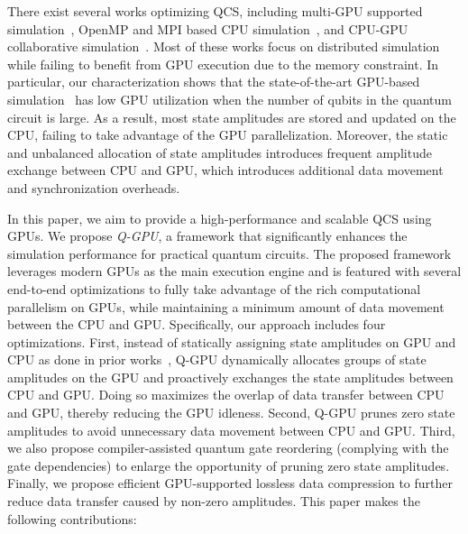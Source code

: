 There exist several works optimizing QCS, including multi-GPU supported simulation~\cite{10.1109/SC41405.2020.00017,10.1007/978-3-319-68505-2_8}, OpenMP and MPI based CPU simulation~\cite{10.1145/3126908.3126947,10.1145/3295500.3356155,10.48550/arXiv.1710.05867}, and CPU-GPU collaborative simulation~\cite{10.1145/3310273.3323053}. Most of these works focus on distributed simulation while failing to benefit from GPU execution due to the memory constraint. 
In particular, our characterization shows that the state-of-the-art GPU-based simulation~\cite{10.1145/3310273.3323053} has low GPU utilization when the number of qubits in the quantum circuit is large. As a result, most state amplitudes are stored and updated on the CPU, failing to take advantage of the GPU parallelization. Moreover, the static and unbalanced allocation of state amplitudes introduces frequent amplitude exchange between CPU and GPU, which introduces additional data movement and synchronization overheads. 


\par In this paper, we aim to provide a high-performance and scalable QCS using GPUs.
We propose \emph{Q-GPU}, a framework that significantly enhances the simulation performance for practical quantum circuits. The proposed framework leverages modern GPUs as the main execution engine and is featured with several end-to-end optimizations to fully take advantage of the rich computational parallelism on GPUs, while maintaining a minimum amount of data movement between the CPU and GPU. Specifically, our approach includes four optimizations. 
First, instead of statically assigning state amplitudes on GPU and CPU as done in prior works~\cite{10.1145/3310273.3323053}, Q-GPU dynamically allocates groups of state amplitudes on the GPU and proactively exchanges the state amplitudes between CPU and GPU. Doing so maximizes the overlap of data transfer between CPU and GPU, thereby reducing the GPU idleness. 
Second, Q-GPU prunes zero state amplitudes to avoid unnecessary data movement between CPU and GPU. 
Third, we also propose compiler-assisted quantum gate reordering (complying with the gate dependencies) to enlarge the opportunity of pruning zero state amplitudes. 
Finally, we propose efficient GPU-supported lossless data compression to further reduce data transfer caused by non-zero amplitudes. This paper makes the following contributions: 

